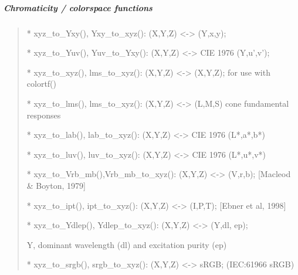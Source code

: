 \documentclass[letterpaper,10pt,english]{sphinxmanual}
\begin{document}
\subparagraph{Chromaticity / colorspace functions}
\label{\detokenize{color:chromaticity-colorspace-functions}}\begin{quote}

\begin{DUlineblock}{0em}
\item[] * xyz\_to\_Yxy(), Yxy\_to\_xyz(): (X,Y,Z) \textless{}-\textgreater{} (Y,x,y);
\item[] * xyz\_to\_Yuv(), Yuv\_to\_Yxy(): (X,Y,Z) \textless{}-\textgreater{} CIE 1976 (Y,u’,v’);
\item[] * xyz\_to\_xyz(), lms\_to\_xyz(): (X,Y,Z) \textless{}-\textgreater{} (X,Y,Z); for use with colortf()
\item[] * xyz\_to\_lms(), lms\_to\_xyz(): (X,Y,Z) \textless{}-\textgreater{} (L,M,S) cone fundamental responses
\item[] * xyz\_to\_lab(), lab\_to\_xyz(): (X,Y,Z) \textless{}-\textgreater{} CIE 1976 (L*,a*,b*)
\item[] * xyz\_to\_luv(), luv\_to\_xyz(): (X,Y,Z) \textless{}-\textgreater{} CIE 1976 (L*,u*,v*)
\item[] * xyz\_to\_Vrb\_mb(),Vrb\_mb\_to\_xyz(): (X,Y,Z) \textless{}-\textgreater{} (V,r,b); {[}Macleod \& Boyton, 1979{]}
\item[] * xyz\_to\_ipt(), ipt\_to\_xyz(): (X,Y,Z) \textless{}-\textgreater{} (I,P,T); {[}Ebner et al, 1998{]}
\item[] * xyz\_to\_Ydlep(), Ydlep\_to\_xyz(): (X,Y,Z) \textless{}-\textgreater{} (Y,dl, ep); 
\item[]
\begin{DUlineblock}{\DUlineblockindent}
\item[] Y, dominant wavelength (dl) and excitation purity (ep)
\end{DUlineblock}
\item[] * xyz\_to\_srgb(), srgb\_to\_xyz(): (X,Y,Z) \textless{}-\textgreater{} sRGB; (IEC:61966 sRGB)
\end{DUlineblock}
\end{quote}
\end{document}
